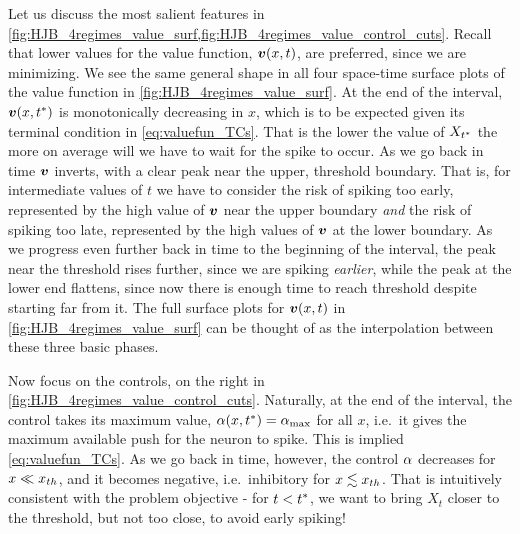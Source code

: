 \documentclass{article}
\begin{document}
Let us discuss the most salient features in
\cref{fig:HJB_4regimes_value_surf,fig:HJB_4regimes_value_control_cuts}. Recall
that lower values for the value function, ${ \boldsymbol{v} }(x,t)$, are preferred, since we are
minimizing. We see the same general shape in all four space-time surface plots
of the value function in \cref{fig:HJB_4regimes_value_surf}. At the end of the
interval, ${ \boldsymbol{v} }(x,{ t^* })$ is monotonically decreasing in $x$, which is to be expected
given its terminal condition in \cref{eq:valuefun_TCs}. That is the lower the
value of $X_{ t^* }$ the more on average will we have to wait for the spike to occur.
As we go back in time ${ \boldsymbol{v} }$ inverts, with a clear peak near the upper, threshold
boundary. That is, for intermediate values of $t$ we have to consider the risk
of spiking too early, represented by the high value of ${ \boldsymbol{v} }$ near the upper
boundary {\sl and} the risk of spiking too late, represented by the high values
of ${ \boldsymbol{v} }$ at the lower boundary. As we progress even further back in time to the
beginning of the interval, the peak near the threshold rises further, since we are spiking
{\sl earlier}, while the peak at the lower end flattens, since now there is
enough time to reach threshold despite starting far from it. The full surface
plots for ${ \boldsymbol{v} }(x,t)$ in \cref{fig:HJB_4regimes_value_surf} can be thought of as
the interpolation between these three basic phases.

Now focus on the controls, on the right in
\cref{fig:HJB_4regimes_value_control_cuts}. Naturally, at the end of the
interval, the control takes its maximum value, ${\alpha}(x,{ t^* }) = { {\alpha}_{\textrm{max}} }$ for all $x$,
i.e.\ it gives the maximum available push for the neuron to spike. This is
implied \cref{eq:valuefun_TCs}. As we go back in time, however, the control ${\alpha}$
decreases for $x \ll { x_{th} }$, and it becomes negative, i.e.\ inhibitory for $x
\lesssim { x_{th} }$. That is intuitively consistent with the problem objective - for
$t<{ t^* }$, we want to bring $X_t$ closer to the threshold, but not too close, to
avoid early spiking!
\end{document}
